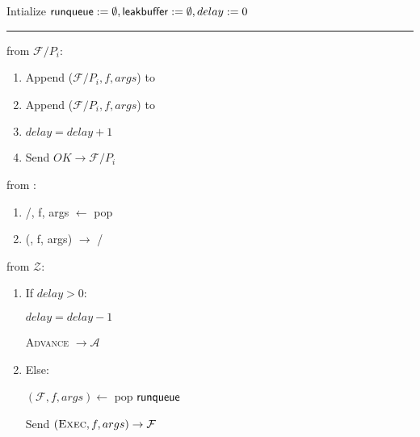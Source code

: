 \begin{bbox}[title={\textbf{Wrapper} $\Wasync$} ] 

Intialize ${\mathsf {runqueue}} := \emptyset, {\mathsf {leakbuffer}} := \emptyset, delay := 0$

\vspace{2mm} \hrule \vspace{2mm}

\OnInput {} from $\mathcal{F}/P_i$:
	\begin{enumerate}
		\item Append ($\mathcal{F}/P_i, f, args$) to 
		\item Append ($\mathcal{F}/P_i, f, args$) to 
		\item $delay = delay + 1$
		\item Send $OK \rightarrow \mathcal{F}/P_i$
	\end{enumerate}


\OnInput {} from \Adversary:
	\begin{enumerate}
		\item \F/\Partyi, f, args $\leftarrow$ pop 
		\item \Send (\Exec, f, args) $\rightarrow$ \F/\Partyi
	\end{enumerate}

\OnInput {} from $\mathcal{Z}$:
	\begin{enumerate}
		\item If $delay > 0$:

			\quad  $delay = delay - 1$

			\quad  \Send \textsc{Advance} $\rightarrow \mathcal{A}$
		\item Else:
			
			\quad $(\mathcal{F}, f, args) \leftarrow$ pop ${\mathsf {runqueue}}$

			\quad Send $(\textsc{Exec}, f, args) \rightarrow \mathcal{F}$
	\end{enumerate}
\end{bbox}
